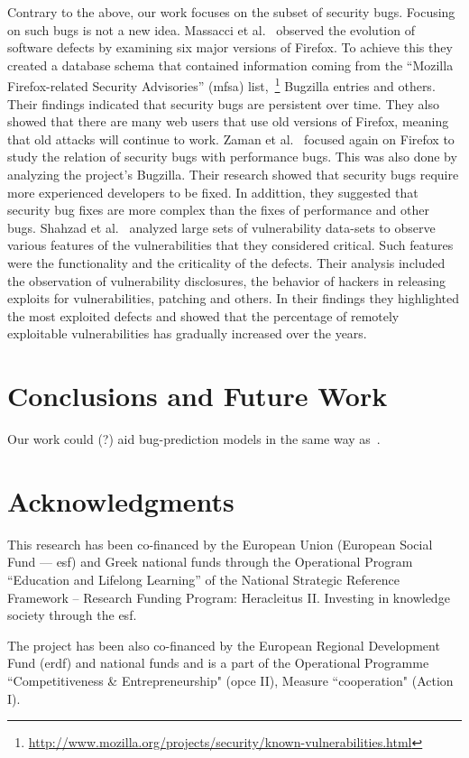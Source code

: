 \documentclass[conference]{llncs}
\begin{document}
Contrary to the above, our work focuses on the subset of security bugs.
Focusing on such bugs is not a new idea. Massacci et al.~\cite{MNN11} observed
the evolution of software defects by examining six major versions of Firefox.
To achieve this they created a database schema that contained information
coming from the ``Mozilla Firefox-related Security Advisories'' ({\sc mfsa})
list,~\footnote{\url{http://www.mozilla.org/projects/security/known-vulnerabilities.html}}
Bugzilla entries and others. Their findings indicated that security bugs are
persistent over time. They also showed that there are many web users that use
old versions of Firefox, meaning that old attacks will continue to work.
Zaman et al.~\cite{ZAH11} focused again on Firefox to study the relation of
security bugs with performance bugs. This was also done by analyzing the project's
Bugzilla. Their research showed that security bugs require more experienced developers
to be fixed. In addittion, they suggested that security bug fixes are more complex than the
fixes of performance and other bugs.
Shahzad et al.~\cite{SSL12} analyzed large sets of vulnerability data-sets to observe
various features of the vulnerabilities that they considered critical. Such features
were the functionality and the criticality of the defects. Their analysis
included the observation of vulnerability disclosures, the behavior of
hackers in releasing exploits for vulnerabilities, patching and others. In
their findings they highlighted the most exploited defects and showed that
the percentage of remotely exploitable vulnerabilities has gradually increased
over the years.

\section{Conclusions and Future Work}
\label{sec:con}

Our work could (?) aid bug-prediction models in the same way as~\cite{BN11}.

\section*{Acknowledgments}

This research has been co-financed by the European Union (European Social Fund
--– {\sc esf}) and Greek national funds through the Operational Program
``Education and Lifelong Learning'' of the National Strategic Reference Framework –
Research Funding Program: Heracleitus II. Investing in knowledge society
through the {\sc esf}.

The project has been also co-financed by the European Regional Development Fund ({\sc erdf})
and national funds and is a part of the Operational Programme ``Competitiveness \&
Entrepreneurship" ({\sc opce} II), Measure ``{\sc cooperation}" (Action I).


 
\end{document}
